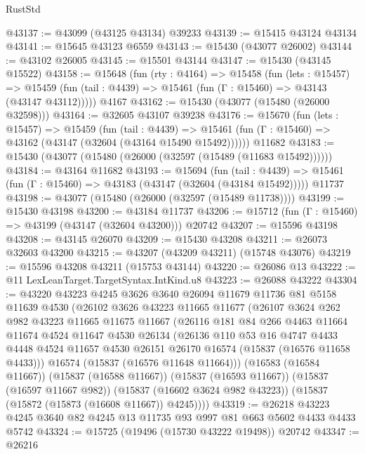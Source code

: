 \begin{lexlean}{RustStd}
\begin{coremodule}
@43137 := @43099 (@43125 @43134) @39233
@43139 := @15415 @43124 @43134
@43141 := @15645 @43123 @6559
@43143 := @15430 (@43077 @26002)
@43144 := @43102 @26005
@43145 := @15501 @43144
@43147 := @15430 (@43145 @15522)
@43158 := @15648
    (fun (rty : @4164) =>
    @15458
      (fun (lets : @15457) =>
      @15459 (fun (tail : @4439) => @15461 (fun (Γ : @15460) => @43143 (@43147 @43112)))))
    @4167
@43162 := @15430 (@43077 (@15480 (@26000 @32598)))
@43164 := @32605 @43107 @39238
@43176 := @15670
    (fun (lets : @15457) =>
    @15459
      (fun (tail : @4439) =>
      @15461 (fun (Γ : @15460) => @43162 (@43147 (@32604 (@43164 @15490 @15492))))))
    @11682
@43183 := @15430 (@43077 (@15480 (@26000 (@32597 (@15489 (@11683 @15492))))))
@43184 := @43164 @11682
@43193 := @15694
    (fun (tail : @4439) => @15461 (fun (Γ : @15460) => @43183 (@43147 (@32604 (@43184 @15492)))))
    @11737
@43198 := @43077 (@15480 (@26000 (@32597 (@15489 @11738))))
@43199 := @15430 @43198
@43200 := @43184 @11737
@43206 := @15712 (fun (Γ : @15460) => @43199 (@43147 (@32604 @43200))) @20742
@43207 := @15596 @43198
@43208 := @43145 @26070
@43209 := @15430 @43208
@43211 := @26073 @32603 @43200
@43215 := @43207 (@43209 @43211) (@15748 @43076)
@43219 := @15596 @43208 @43211 (@15753 @43144)
@43220 := @26086 @13
@43222 := @11 LexLeanTarget.TargetSyntax.IntKind.u8
@43223 := @26088 @43222
@43304 := @43220
    @43223
    @4245
    @3626
    @3640
    @26094
    @11679
    @11736
    @81
    @5158
    @11639
    @4530
    (@26102
      @3626
      @43223
      @11665
      @11677
      (@26107
        @3624
        @262
        @982
        @43223
        @11665
        @11675
        @11667
        (@26116
          @181
          @84
          @266
          @4463
          @11664
          @11674
          @4524
          @11647
          @4530
          @26134
          (@26136
            @110
            @53
            @16
            @4747
            @4433
            @4448
            @4524
            @11657
            @4530
            @26151
            @26170
            @16574
            (@15837 (@16576 @11658 @4433)))
          @16574
          (@15837 (@16576 @11648 @11664)))
        (@16583 (@16584 @11667))
        (@15837 (@16588 @11667))
        (@15837 (@16593 @11667))
        (@15837 (@16597 @11667 @982))
        (@15837 (@16602 @3624 @982 @43223))
        (@15837 (@15872 (@15873 (@16608 @11667)) @4245))))
@43319 := @26218 @43223 @4245 @3640 @82 @4245 @13 @11735 @93 @997 @81 @663 @5602 @4433 @4433 @5742
@43324 := @15725 (@19496 (@15730 @43222 @19498)) @20742
@43347 := @26216

\end{coremodule}
\end{lexlean}
